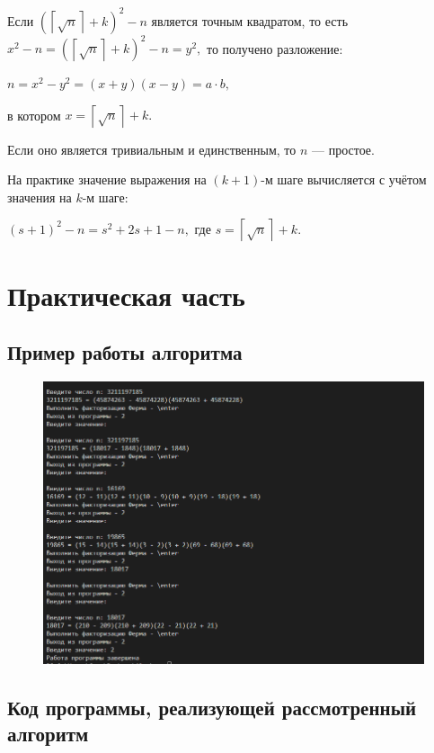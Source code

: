 \documentclass[bachelor, och, labwork]{shiza}
\begin{document}
Если $\left(\left\lceil {\sqrt {n}}\right\rceil +k\right)^{2}-n$ является 
точным квадратом, то есть $x^{2}-n=\left(\left\lceil {\sqrt {n}}\right\rceil +k\right)^{2}-n=y^{2},$
то получено разложение:

$n=x^{2}-y^{2}=(x+y)(x-y)=a\cdot b,$

в котором $\displaystyle x=\left\lceil {\sqrt {n}}\right\rceil +k.$

Если оно является тривиальным и единственным, то $n$ --- простое.

На практике значение выражения на $(k+1)$-м шаге вычисляется с учётом значения 
на $k$-м шаге:

$(s+1)^{2}-n=s^{2}+2s+1-n,$
где $s=\left\lceil {\sqrt {n}}\right\rceil +k.$


\section{Практическая часть}
\subsection{Пример работы алгоритма}
\begin{figure}[H]
    \centering
    \includegraphics[width=1\textwidth]{pic1.png}
    \caption{}
\end{figure}

    \subsection{Код программы, реализующей рассмотренный алгоритм}
        \inputminted{python}{lab11.py}
\end{document}
